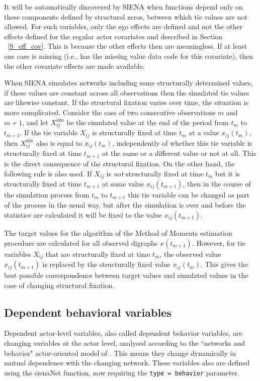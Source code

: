 \documentclass[a4paper,fleqn,11pt]{article}
\newcommand{\+}{\, + \,}
\newcommand{\sfn}[1]{\textsf{#1}}
\newcommand{\SI}{{\sf SIENA }}
\begin{document}
{It will be automatically discovered by \SI when functions
depend only on these components defined by structural zeros,
between which tie values are not allowed.
For such variables, only the ego effects are defined
and not the other effects defined for the regular
actor covariates and described in Section ~\ref{S_eff_cov}.
This is because the other effects then are meaningless.
If at least one case is missing (i.e., has the missing value data code
for this covariate),
then the other covariate effects are made available.

When \SI simulates networks including some structurally determined values,
if these values are constant across all observations then
the simulated tie values are likewise constant.
If the structural fixation varies over time, the situation
is more complicated.
Consider the case of two consecutive observations
$m$ and $m+1$,
and let $X^{\text{sim}}_{ij}$ be the simulated value
at the end of the period from $t_m$ to $t_{m+1}$.
If the tie variable $X_{ij}$ is structurally fixed at time $t_m$
at a value $x_{ij}(t_m)$,
then $X^{\text{sim}}_{ij}$ also is equal to $x_{ij}(t_m)$,
independently of whether this tie variable is structurally fixed
at time $t_{m+1}$ at the same or a different value or not at all.
This is the direct consequence of the structural fixation.
On the other hand, the following rule is also used.
If $X_{ij}$ is \emph{not} structurally fixed at time $t_m$
but it is structurally fixed at time $t_{m+1}$ at some value $x_{ij}(t_{m+1})$,
then in the course of the simulation process from  $t_m$ to $t_{m+1}$
this tie variable can be changed as part of the process in the usual way,
but after the simulation is over and before the statistics are calculated it will be fixed
to the value $x_{ij}(t_{m+1})$.

The target values for the algorithm of the Method of Moments estimation
procedure are calculated for all observed digraphs $x(t_{m+1})$.
However, for tie variables $X_{ij}$ that are
structurally fixed at time $t_m$, the observed value  $x_{ij}(t_{m+1})$
is replaced by the structurally fixed value  $x_{ij}(t_{m})$.
This gives the best possible correspondence between target values
and simulated values in the case of changing structural fixation.

\subsection{Dependent behavioral variables}

Dependent actor-level variables, also called dependent
behavior variables, are changing variables at the actor level,
analysed according to the ``networks and behavior" actor-oriented
model of \citet{SnijdersEA07, SteglichEA10}.
This means they change dynamically in
mutual dependence with the changing network.
These variables also are defined using the \sfn{sienaNet} function,
now requiring the \texttt{type = behavior} parameter.

}
\end{document}
